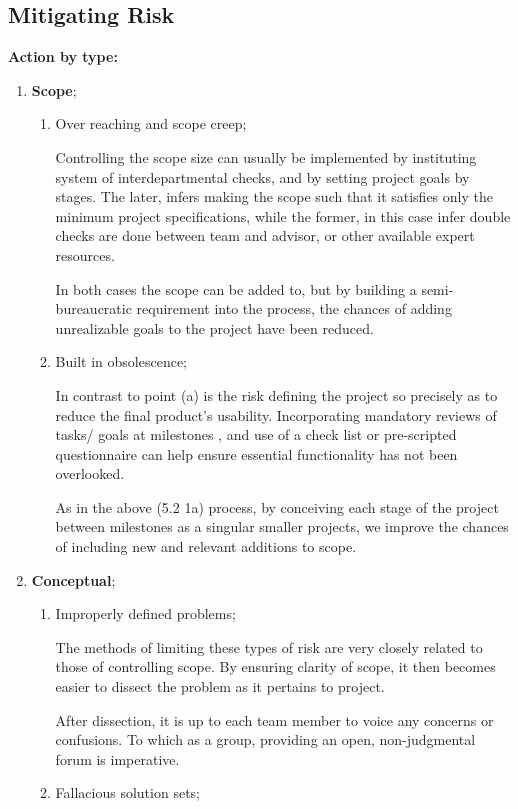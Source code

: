  \subsection{Mitigating Risk}
  \hspace{.35cm} \textbf{Action by type:}
  \begin{enumerate}
  \item \textbf{Scope};
  \begin{enumerate}
  \item Over reaching and scope creep;

  Controlling the scope size can usually be implemented by instituting system of interdepartmental checks, and by setting project goals by stages. The later, infers making the scope such that it satisfies only the minimum project specifications, while the former, in this case infer double checks are done between team and advisor, or other available expert resources.

  In both cases the scope can be added to, but by building a semi-bureaucratic requirement into the process, the chances of adding unrealizable goals to the project have been reduced.
  \item Built in obsolescence;

  In contrast to point (a) is the risk defining the project so precisely as to reduce the final product's usability. Incorporating  mandatory reviews of tasks/ goals at milestones , and use of a check list or pre-scripted questionnaire can help ensure essential functionality has not been overlooked.

  As in the above (5.2 1a) process, by conceiving each stage of the  project between milestones as a singular smaller projects, we improve the chances of including new and relevant additions to scope.
   \end{enumerate}
  \item \textbf{Conceptual};
  \begin{enumerate}
  \item Improperly defined problems;

  The methods of limiting these types of risk are very closely related to those of controlling scope. By ensuring clarity of scope, it then becomes easier to dissect the problem as it pertains to project.

  After dissection, it is up to each team member to voice any concerns or confusions. To which as a group, providing an open, non-judgmental forum is imperative.
  \item Fallacious solution sets;


\end{enumerate}
\end{enumerate}

